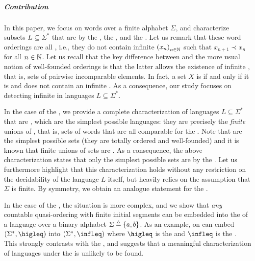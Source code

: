 \subparagraph{Contribution} 
\AP
In this paper, we focus on words over a finite
alphabet $\Sigma$, and characterize subsets $L \subseteq \Sigma^*$ that are
 by the , the ,
and the . Let us remark that these word orderings are all
, i.e., they do not contain infinite  $\seqof{x_n}$ such that $x_{n+1} \prec x_n$ for all $n \in \mathbb{N}$.
Let us recall that the key difference between  and the
more usual notion of well-founded orderings is that the latter allows the
existence of infinite , that is, sets of pairwise
incomparable elements. In fact, a set $X$ is  if and
only if it is  and does not contain an infinite 
\cite{KRU72}.  As a consequence, our study focuses on detecting infinite
 in languages $L \subseteq \Sigma^*$.

In the case of the , we provide a complete characterization
of languages $L \subseteq \Sigma^*$ that are , which are
the simplest possible languages: they are precisely the \emph{finite} unions of
, that is, sets of words that are all comparable for the
. Note that  are the simplest possible
 sets (they are totally ordered and well-founded) and it
is known that finite unions of  sets are
. As a consequence, the above characterization states
that only the simplest possible  sets are
 by the . Let us furthermore
highlight that this characterization holds without any restriction on the
decidability of the language $L$ itself, but heavily relies on the assumption
that $\Sigma$ is finite. By symmetry, we obtain an analogue statement for the
.

In the case of the , the situation is more complex, and we
show that \emph{any} countable quasi-ordering with finite initial segments can
be embedded into the  of a language over a binary alphabet
$\Sigma \triangleq \{ a,b \}$. As an example, on can embed $(\Sigma^*, \higleq)$
into $(\Sigma^*, \infleq)$ where $\higleq$ is the  and
$\infleq$ is the . This strongly contrasts with the
, and suggests that a meaningful characterization of
 languages under the  is unlikely to
be found. 

